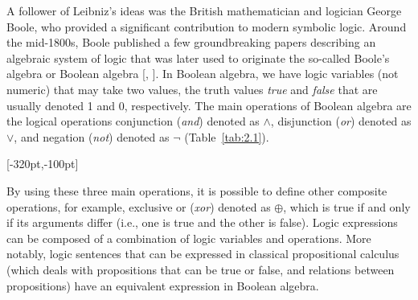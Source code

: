 A follower of Leibniz's ideas was the British mathematician and logician George Boole, who provided a significant contribution to modern symbolic logic. Around the mid-1800s, Boole published a few groundbreaking papers describing an algebraic system of logic that was later used to originate the so-called Boole's algebra or Boolean algebra [\citealt{chap:02:Boole:1848}, \citeyear{chap:02:Boole:2009}]. In Boolean algebra, we have logic variables (not numeric) that may take two values, the truth values \textit{true} and \textit{false} that are usually denoted 1 and 0, respectively. The main operations of Boolean algebra are the logical operations conjunction (\textit{and}) denoted as $\wedge $, disjunction (\textit{or}) denoted as $\vee $, and negation (\textit{not}) denoted as $\neg$ (Table~\ref{tab:2.1}).

\begin{table}[!b]
\caption{The three basic Boolean operations\label{tab:2.1}}
[-320pt,-100pt]
\vspace*{-6pt}
\end{table}

By using these three main operations, it is possible to define other composite operations, for example, exclusive or (\textit{xor}) denoted as $\oplus$, which is true if and only if its arguments differ (i.e., one is true and the other is false). Logic expressions can be composed of a combination of logic variables and operations. More notably, logic sentences that can be expressed in classical propositional calculus (which deals with propositions that can be true or false, and relations between propositions) have an equivalent expression in Boolean algebra.

